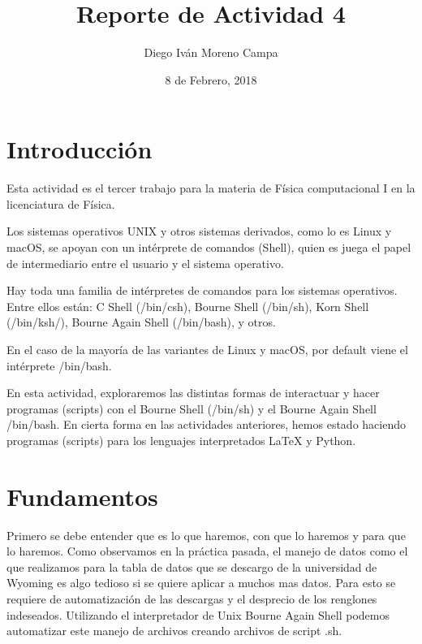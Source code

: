 \documentclass{article}
\title{Reporte de Actividad 4}
\author{Diego Iván Moreno Campa}
\date{8 de Febrero, 2018}
\begin{document}
\maketitle

\bigskip

\section{Introducción}

Esta actividad es el tercer trabajo para la materia de Física computacional I en la licenciatura de Física.

Los sistemas operativos UNIX y otros sistemas derivados, como lo es Linux y macOS, se apoyan con un intérprete de comandos (Shell), quien es juega el papel de intermediario entre el usuario y el sistema operativo.

Hay toda una familia de intérpretes de comandos para los sistemas operativos. Entre ellos están:  C Shell (/bin/csh), Bourne Shell (/bin/sh), Korn Shell (/bin/ksh/), Bourne Again Shell (/bin/bash), y otros. 

En el caso de la mayoría de las variantes de Linux y macOS, por default viene el intérprete /bin/bash.

En esta actividad, exploraremos las distintas formas de interactuar y hacer programas (scripts) con el Bourne Shell (/bin/sh) y el Bourne Again Shell /bin/bash. En cierta forma en las actividades anteriores, hemos estado haciendo programas (scripts) para los lenguajes interpretados LaTeX y Python.

\section{Fundamentos}

Primero se debe entender que es lo que haremos, con que lo haremos y para que lo haremos. Como observamos en la práctica pasada, el manejo de datos como el que realizamos para la tabla de datos que se descargo de la universidad de Wyoming es algo tedioso si se quiere aplicar a muchos mas datos. Para esto se requiere de automatización de las descargas y el desprecio de los renglones indeseados.
Utilizando el interpretador de Unix Bourne Again Shell podemos automatizar este manejo de archivos creando archivos de script .sh.
\end{document}
